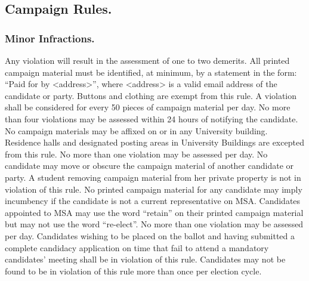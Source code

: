 \subsection{Campaign Rules.}

\subsubsection{Minor Infractions.}
Any violation will result in the assessment of one to two demerits.
All printed campaign material must be identified, at minimum, by a statement in the form: ``Paid for by <address>'', where <address> is a valid email address of the candidate or party.  Buttons and clothing are exempt from this rule.  A violation shall be considered for every 50 pieces of campaign material per day.  No more than four violations may be assessed within 24 hours of notifying the candidate.
No campaign materials may be affixed on or in any University building.  Residence halls and designated posting areas in University Buildings are excepted from this rule. No more than one violation may be assessed per day.
No candidate may move or obscure the campaign material of another candidate or party.  A student removing campaign material from her private property is not in violation of this rule.
No printed campaign material for any candidate may imply incumbency if the candidate is not a current representative on MSA.  Candidates appointed to MSA may use the word ``retain'' on their printed campaign material but may not use the word ``re-elect''.  No more than one violation may be assessed per day.
  Candidates wishing to be placed on the ballot and having submitted a complete candidacy application on time that fail to attend a mandatory candidates' meeting shall be in violation of this rule. Candidates may not be found to be in violation of this rule more than once per election cycle.

